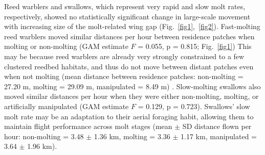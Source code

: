 \begin{refsection}
Reed warblers and swallows, which represent very rapid and slow molt rates, respectively, showed no statistically significant change in large-scale movement with increasing size of the molt-related wing gap (Fig.~\ref{fig1},~\ref{fig2}).
Fast-molting reed warblers moved similar distances per hour between residence patches when molting or non-molting (GAM estimate $F$ = 0.055, p = 0.815; Fig.~\ref{fig1})
This may be because reed warblers are already very strongly constrained to a few clustered reedbed habitats, and thus do not move between distant patches even when not molting (mean distance between residence patches: non-molting = 27.20 m, molting = 29.09 m, manipulated = 8.49 m) \citep{kiat2016}.
Slow-molting swallows also moved similar distances per hour when they were either non-molting, molting, or artificially manipulated (GAM estimate $F$ = 0.129, p = 0.723).
Swallows' slow molt rate may be an adaptation to their aerial foraging habit, allowing them to maintain flight performance across molt stages (mean $\pm$ SD distance flown per hour: non-molting = 3.48 $\pm$ 1.36 km, molting = 3.36 $\pm$ 1.17 km, manipulated = 3.64 $\pm$ 1.96 km).


\end{refsection}
